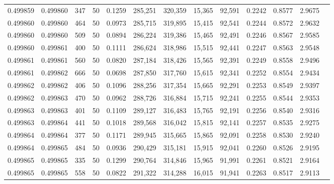 \begin{tabular}{rrrrrrrrrrrrr}
0.499859 & 0.499860 &   347 &  50 &                                     0.1259 & 285,251 & 320,359 &  15,365 &  92,591 & 0.2242 & 0.8577 & 2.9675 \\
0.499860 & 0.499860 &   464 &  50 &                                     0.0973 & 285,715 & 319,895 &  15,415 &  92,541 & 0.2244 & 0.8572 & 2.9632 \\
0.499860 & 0.499860 &   509 &  50 &                                     0.0894 & 286,224 & 319,386 &  15,465 &  92,491 & 0.2246 & 0.8567 & 2.9585 \\
0.499860 & 0.499861 &   400 &  50 &                                     0.1111 & 286,624 & 318,986 &  15,515 &  92,441 & 0.2247 & 0.8563 & 2.9548 \\
0.499861 & 0.499861 &   560 &  50 &                                     0.0820 & 287,184 & 318,426 &  15,565 &  92,391 & 0.2249 & 0.8558 & 2.9496 \\
0.499861 & 0.499862 &   666 &  50 &                                     0.0698 & 287,850 & 317,760 &  15,615 &  92,341 & 0.2252 & 0.8554 & 2.9434 \\
0.499862 & 0.499862 &   406 &  50 &                                     0.1096 & 288,256 & 317,354 &  15,665 &  92,291 & 0.2253 & 0.8549 & 2.9397 \\
0.499862 & 0.499863 &   470 &  50 &                                     0.0962 & 288,726 & 316,884 &  15,715 &  92,241 & 0.2255 & 0.8544 & 2.9353 \\
0.499863 & 0.499863 &   401 &  50 &                                     0.1109 & 289,127 & 316,483 &  15,765 &  92,191 & 0.2256 & 0.8540 & 2.9316 \\
0.499863 & 0.499864 &   441 &  50 &                                     0.1018 & 289,568 & 316,042 &  15,815 &  92,141 & 0.2257 & 0.8535 & 2.9275 \\
0.499864 & 0.499864 &   377 &  50 &                                     0.1171 & 289,945 & 315,665 &  15,865 &  92,091 & 0.2258 & 0.8530 & 2.9240 \\
0.499864 & 0.499865 &   484 &  50 &                                     0.0936 & 290,429 & 315,181 &  15,915 &  92,041 & 0.2260 & 0.8526 & 2.9195 \\
0.499865 & 0.499865 &   335 &  50 &                                     0.1299 & 290,764 & 314,846 &  15,965 &  91,991 & 0.2261 & 0.8521 & 2.9164 \\
0.499865 & 0.499865 &   558 &  50 &                                     0.0822 & 291,322 & 314,288 &  16,015 &  91,941 & 0.2263 & 0.8517 & 2.9113 \\

\end{tabular}
